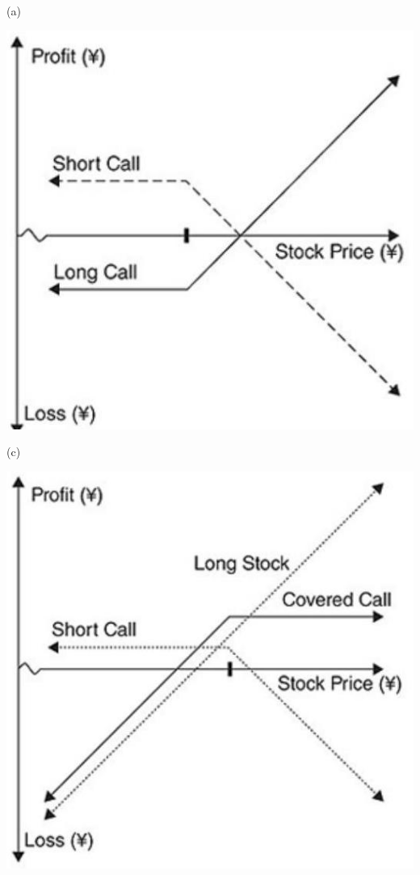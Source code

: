 \documentclass[11pt]{article}
\begin{document}
(a)

\begin{center}
\includegraphics[max width=\textwidth]{2024_04_11_d71a2c9aea882dc3a7b2g-3(2)}
\end{center}

(c)

\begin{center}
\includegraphics[max width=\textwidth]{2024_04_11_d71a2c9aea882dc3a7b2g-3(4)}
\end{center}
\end{document}
